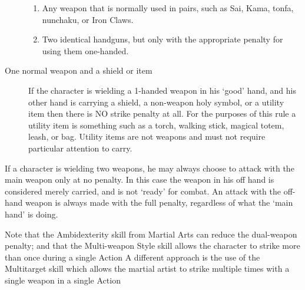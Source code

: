 \documentclass[twoside]{book}
\begin{document}
\begin{description}
{\begin{enumerate}
                    
  \item 
                      
    {  
    Any weapon that is normally used in pairs,
                       such as Sai, Kama, tonfa, nunchaku, or Iron Claws.
                       
    }
  
                    
  \item 
                      
    {  
    Two identical handguns, but only with the
                       appropriate penalty for using them one-handed.
                       
    }
  
                    
\end{enumerate}
    
                
    }
  
  \item[ One normal weapon and a shield or item
                   ] 
    {  
     If the character is wielding a 1-handed weapon
                   in his `good' hand, and his other hand is
                   carrying a shield, a non-weapon holy symbol, or a
                   utility item then there is NO strike penalty at all.
                   For the purposes of this rule a utility item is
                   something such as a torch, walking stick, magical
                   totem, leash, or bag. Utility items are not weapons
                   and must not require particular attention to carry.
                   
    }
  
\end{description}
  
    {  
    If a character is wielding two weapons, he may
               always choose to attack with the main weapon only at no
               penalty. In this case the weapon in his off hand is
               considered merely carried, and is not `ready'
               for combat. An attack with the off-hand weapon is always
               made with the full penalty, regardless of what the
               `main hand' is doing. 
    }
  
    {  
    Note that the Ambidexterity skill from Martial Arts
               can reduce the dual-weapon penalty; and that the
               Multi-weapon Style skill allows the character to strike
               more than once during a single Action A different approach
               is the use of the Multitarget skill which allows the
               martial artist to strike multiple times with a single
               weapon in a single Action 
    }
  
\end{document}
